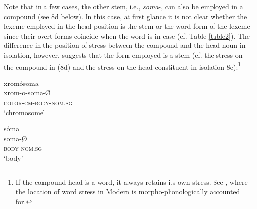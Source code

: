 \documentclass[output=paper]{LSP/langsci}
\begin{document}
Note that  in a few cases, the other stem, i.e., \textit{soma}-, can also be employed in a compound (see 8d below). In this case, at first glance it is not clear whether the lexeme employed in the head position is the stem or the word form of the lexeme since their overt forms coincide when the word is in  case (cf. Table \ref{table2}). The difference in the position of stress between the compound and the head noun in isolation, however, suggests that the form employed is a stem (cf. the stress on the compound in (8d) and the stress on the head constituent in isolation 8e):\footnote{If the compound head is a word, it always retains its own stress. See \citet{Ralli1988}, where the location of word stress in Modern  is morpho-phonologically accounted for. }
\begin{multicols}{2}
\begin{exe}
\begin{xlist}
	\label{ex:8d}
		\glll	xromósoma\\
				xrom-o-soma-{\O} \\
				\textsc{color-cm-body-nom.sg}\\
		\glt	`chromosome'
		
	\label{ex:8e}
		\glll	sóma\\
				soma-{\O} \\
				\textsc{body-nom.sg}\\
		\glt	`body'	
	
\end{xlist}
\end{exe} 
\end{multicols}
\end{document}
